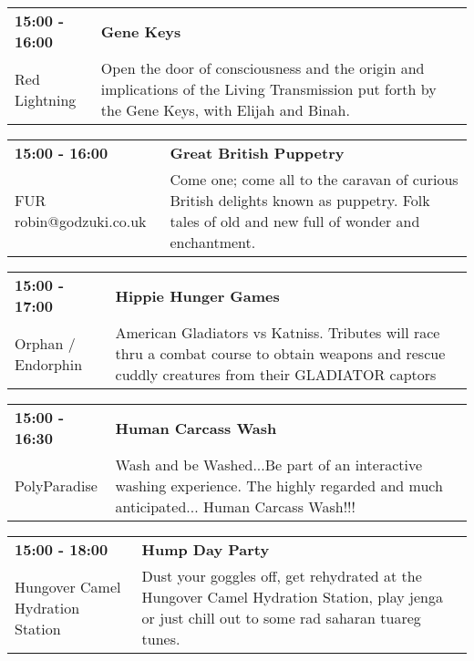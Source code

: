 \begin{tabular}{ p{1in} p{2.2in} }
    \textbf{15:00 - 16:00} & \textbf{Gene Keys} \\
    Red Lightning \newline  & Open the door of consciousness and the origin and implications of the Living Transmission put forth by the Gene Keys, with Elijah and Binah. \\
    \hline 
\end{tabular}
    
\begin{tabular}{ p{1in} p{2.2in} }
    \textbf{15:00 - 16:00} & \textbf{Great British Puppetry} \\
    FUR \newline robin@godzuki.co.uk & Come one; come all to the caravan of curious British delights known as puppetry. Folk tales of old and new full of wonder and enchantment. \\
    \hline 
\end{tabular}
    
\begin{tabular}{ p{1in} p{2.2in} }
    \textbf{15:00 - 17:00} & \textbf{Hippie Hunger Games} \\
    Orphan / Endorphin \newline  & American Gladiators vs Katniss. Tributes will race thru a combat course to obtain weapons and rescue cuddly creatures from their GLADIATOR captors \\
    \hline 
\end{tabular}
    
\begin{tabular}{ p{1in} p{2.2in} }
    \textbf{15:00 - 16:30} & \textbf{Human Carcass Wash} \\
    PolyParadise \newline  & Wash and be Washed...Be part of an interactive washing experience.
The highly regarded and much anticipated... Human Carcass Wash!!! \\
    \hline 
\end{tabular}
    
\begin{tabular}{ p{1in} p{2.2in} }
    \textbf{15:00 - 18:00} & \textbf{Hump Day Party} \\
    Hungover Camel Hydration Station \newline  & Dust your goggles off, get rehydrated at the Hungover Camel Hydration Station, play jenga or just chill out to some rad saharan tuareg tunes. \\
    \hline 
\end{tabular}
    
